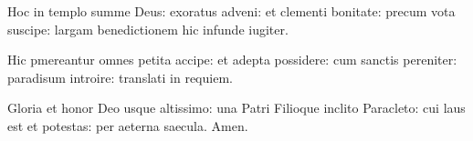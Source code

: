 Hoc in templo summe Deus:
exoratus adveni:
et clementi bonitate:
precum vota suscipe:
largam benedictionem hic infunde iugiter.

Hic pmereantur omnes petita accipe:
et adepta possidere:
cum sanctis pereniter:
paradisum introire:
translati in requiem.

Gloria et honor Deo usque altissimo:
una Patri Filioque inclito Paracleto:
cui laus est et potestas:
per aeterna saecula.
Amen.
